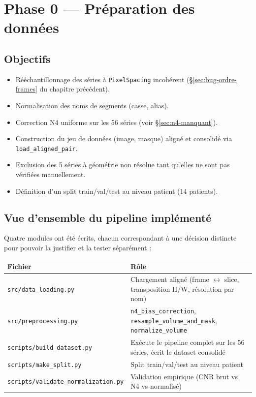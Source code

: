 \chapter{Phase 0 --- Préparation des données}

\section{Objectifs}

\begin{itemize}[nosep]
    \item Rééchantillonnage des séries à \texttt{PixelSpacing} incohérent (\S\ref{sec:bug-ordre-frames} du chapitre précédent).
    \item Normalisation des noms de segments (casse, alias).
    \item Correction N4 uniforme sur les 56 séries (voir \S\ref{sec:n4-manquant}).
    \item Construction du jeu de données (image, masque) aligné et consolidé via \texttt{load\_aligned\_pair}.
    \item Exclusion des 5 séries à géométrie non résolue tant qu'elles ne sont pas vérifiées manuellement.
    \item Définition d'un split train/val/test au niveau patient (14 patients).
\end{itemize}

\section{Vue d'ensemble du pipeline implémenté}

Quatre modules ont été écrits, chacun correspondant à une décision distincte pour pouvoir la
justifier et la tester séparément :

\begin{center}
\begin{tabular}{ll}
\toprule
Fichier & Rôle \\
\midrule
\texttt{src/data\_loading.py} & Chargement aligné (frame $\leftrightarrow$ slice, transposition H/W, résolution par nom) \\
\texttt{src/preprocessing.py} & \texttt{n4\_bias\_correction}, \texttt{resample\_volume\_and\_mask}, \texttt{normalize\_volume} \\
\texttt{scripts/build\_dataset.py} & Exécute le pipeline complet sur les 56 séries, écrit le dataset consolidé \\
\texttt{scripts/make\_split.py} & Split train/val/test au niveau patient \\
\texttt{scripts/validate\_normalization.py} & Validation empirique (CNR brut vs N4 vs normalisé) \\
\bottomrule
\end{tabular}
\end{center}

